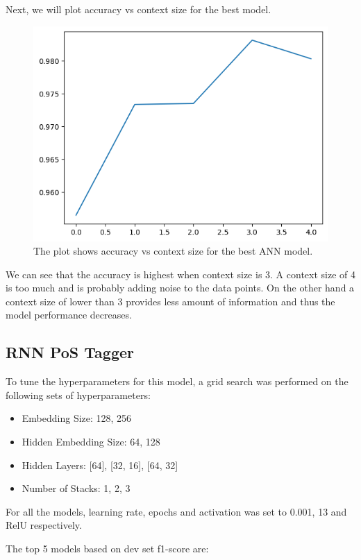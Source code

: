 \documentclass[a4paper,9pt]{report}
\begin{document}
Next, we will plot accuracy vs context size for the best model.

\begin{figure}[H]
    \centering
    \includegraphics[scale=0.4]{../plots/accuracyVsContextSize.png}    
    \caption*{The plot shows accuracy vs context size for the best ANN model.}
\end{figure}

We can see that the accuracy is highest when context size is 3. A context size of 4 is too much and is probably adding noise to the data points. On the other hand a context size of lower than 3 provides less amount of information and thus the model performance decreases.

\subsection*{RNN PoS Tagger}
To tune the hyperparameters for this model, a grid search was performed on the following sets of hyperparameters:
\begin{itemize}
    \item Embedding Size: 128, 256
    \item Hidden Embedding Size: 64, 128
    \item Hidden Layers: [64], [32, 16], [64, 32]
    \item Number of Stacks: 1, 2, 3
\end{itemize}
For all the models, learning rate, epochs and activation was set to 0.001, 13 and RelU respectively.

The top 5 models based on dev set f1-score are:
\end{document}
